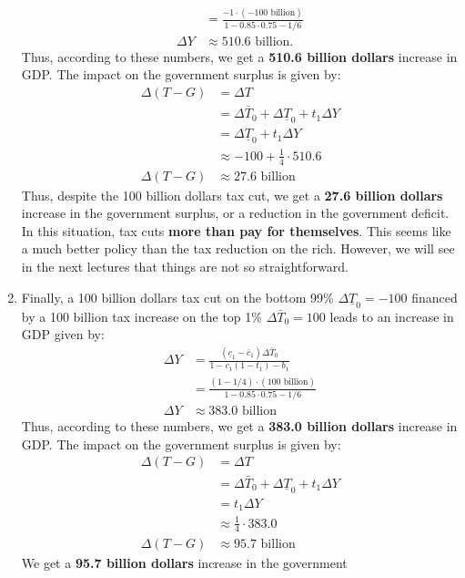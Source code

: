 \documentclass[]{book}
\begin{document}
\begin{enumerate}
\[\begin{aligned}
  &=\frac{-1 \cdot (-100 \text{ billion})}{1-0.85 \cdot 0.75-1/6}\\
  \Delta Y&\approx 510.6 \text{ billion}.
  \end{aligned}
  \] Thus, according to these numbers, we get a \textbf{510.6 billion
  dollars} increase in GDP. The impact on the government surplus is
  given by: \[
  \begin{aligned}
  \Delta\left(T-G\right)&=\Delta T\\
  &=\Delta\bar{T}_{0}+\Delta\underline{T}_{0}+t_1\Delta Y\\
  &=\Delta\underline{T}_{0}+t_1\Delta Y \\
  & \approx -100 + \frac{1}{4} \cdot 510.6\\
  \Delta\left(T-G\right)  & \approx 27.6 \text{ billion}
  \end{aligned}
  \] Thus, despite the 100 billion dollars tax cut, we get a
  \textbf{27.6 billion dollars} increase in the government surplus, or a
  reduction in the government deficit. In this situation, tax cuts
  \textbf{more than pay for themselves}. This seems like a much better
  policy than the tax reduction on the rich. However, we will see in the
  next lectures that things are not so straightforward.
\item
  Finally, a 100 billion dollars tax cut on the bottom 99\%
  \(\Delta \underline{T}_0 = -100\) financed by a 100 billion tax
  increase on the top 1\% \(\Delta \bar{T}_0 = 100\) leads to an
  increase in GDP given by: \[
  \begin{aligned}
  \Delta Y &=\frac{(\underline{c}_1-\bar{c}_1) \Delta \bar{T}_0}{1-c_1(1-t_1)-b_1}\\
  &=\frac{(1-1/4) \cdot (100 \text{ billion})}{1-0.85 \cdot 0.75-1/6}\\
  \Delta Y&\approx 383.0 \text{ billion}
  \end{aligned}
  \] Thus, according to these numbers, we get a \textbf{383.0 billion
  dollars} increase in GDP. The impact on the government surplus is
  given by: \[
  \begin{aligned}
  \Delta\left(T-G\right)&=\Delta T\\
  &=\Delta\bar{T}_{0}+\Delta\underline{T}_{0}+t_1\Delta Y\\
  &=t_1\Delta Y \\
  &\approx \frac{1}{4} \cdot 383.0\\
  \Delta\left(T-G\right)  & \approx 95.7 \text{ billion}
  \end{aligned}
  \] We get a \textbf{95.7 billion dollars} increase in the government

\end{enumerate}
\end{document}
